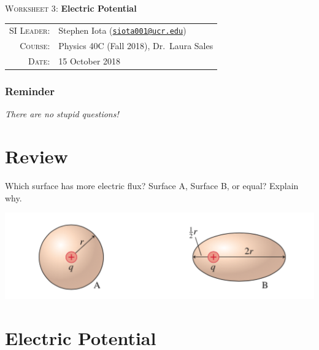 \documentclass[12pt]{article}
\newcommand{\email}[1]{\texttt{\href{mailto:#1}{#1}}}
\begin{document}
\begin{center}

\Large{\textsc{Worksheet 3}: \textbf{Electric Potential}}

\end{center}

\vspace{.5mm}


\begin{tabular}{rl}
\textsc{SI Leader}:
&
Stephen Iota (\email{siota001@ucr.edu})
\\
\textsc{Course}:
&
Physics 40C (Fall 2018), Dr.~Laura Sales
\\
\textsc{Date}:
&
15 October 2018
\end{tabular}


\subsubsection*{Reminder}
\textit{There are no stupid questions!}

\section{Review}

Which surface has more electric flux? Surface A, Surface B, or equal? Explain why.


\begin{center}
	\includegraphics[width=.5\linewidth]{W3-figz}
\end{center}

\vspace{25mm}


\section{Electric Potential}
\end{document}
